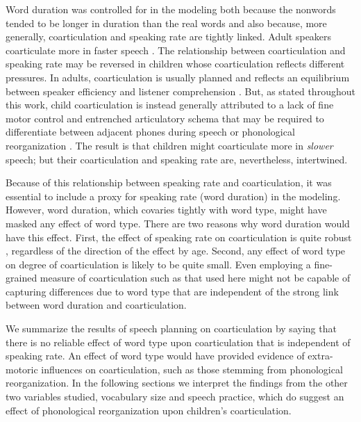\documentclass[a4paper,man,natbib,donotrepeattitle, apacite]{apa6}
\begin{document}
Word duration was controlled for in the modeling both because the nonwords tended to be longer in duration than the real words and also because, more generally, coarticulation and speaking rate are tightly linked. Adult speakers coarticulate more in faster speech \cite{gayMechanismsControlSpeech1981,matthiesVariationAnticipatoryCoarticulation2001}. The relationship between coarticulation and speaking rate may be reversed in children whose coarticulation reflects different pressures.   In adults, coarticulation is usually planned \cite{whalenCoarticulationLargelyPlanned1990} and reflects an equilibrium between speaker efficiency and listener comprehension \cite{bradlowConfluentTalkerListeneroriented2002}. But, as stated throughout this work, child coarticulation is instead generally attributed to a lack of fine motor control and entrenched articulatory schema that may be required to differentiate between adjacent phones during speech \cite{goffmanRelationsSegmentalMotor2007,greenPhysiologicDevelopmentSpeech2000,mcallisterbyunMotorInfluencesGrammar2016} or phonological reorganization \cite{nittrouerEmergencePhoneticSegments1989,nittrouerHowChildrenLearn1996,noiraySpokenLanguageDevelopment2019,redfordGrammaticalWordProduction2018,zharkovaCoarticulationIndicatorSpeech2011}. The result is that children might coarticulate more in \textit{slower} speech; but their coarticulation and speaking rate are, nevertheless, intertwined. 

Because of this relationship between speaking rate and coarticulation, it was essential to include a proxy for speaking rate (word duration) in the modeling. However, word duration, which covaries tightly with word type,  might have masked any effect of word type. There are two reasons why word duration would have this effect. First, the effect of speaking rate on coarticulation is quite robust \cite{gayMechanismsControlSpeech1981,matthiesVariationAnticipatoryCoarticulation2001}, regardless of the direction of the effect by age. Second, any effect of word type on degree of coarticulation is likely to be quite small. Even employing a fine-grained measure of coarticulation such as that used here might not be capable of capturing differences due to word type that are independent of the strong link between word duration and coarticulation. 

We summarize the results of speech planning on coarticulation by saying that there is no reliable effect of word type upon coarticulation that is independent of speaking rate. An effect of word type would have provided evidence of extra-motoric influences on coarticulation, such as those stemming from phonological reorganization. In the following sections we interpret the findings from the other two variables studied, vocabulary size and speech practice, which do suggest an effect of phonological reorganization upon children's coarticulation. 
\end{document}
